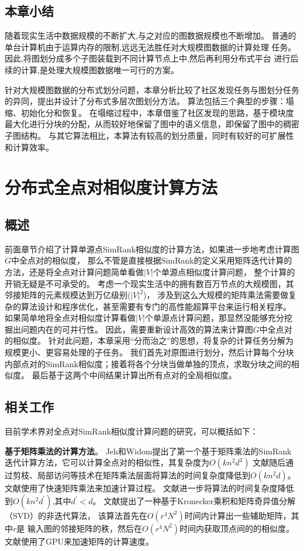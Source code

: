 \documentclass[master]{njuthesis}
\begin{document}
\section{本章小结}
随着现实生活中数据规模的不断扩大,与之对应的图数据规模也不断增加。
普通的单台计算机由于运算内存的限制,远远无法胜任对大规模图数据的计算处理
任务。因此,将图划分成多个子图装载到不同计算节点上中,然后再利用分布式平台
进行后续的计算,是处理大规模图数据唯一可行的方案。

针对大规模图数据的分布式划分问题，本章分析比较了社区发现任务与图划分任务的异同，提出并设计了分布式多层次图划分方法。
算法包括三个典型的步骤：塌缩、初始化分和恢复。
在塌缩过程中，本章借鉴了社区发现的思路，基于模块度最大化进行分块的分配，从而较好地保留了图中的语义信息，即保留了图中的稠密子图结构。
与其它算法相比，本算法有较高的划分质量，同时有较好的可扩展性和计算效率。

\chapter{分布式全点对相似度计算方法}\label{chapter_allSimRank}
\section{概述}
前面章节介绍了计算单源点SimRank相似度的计算方法，如果进一步地考虑计算图$G$中全点对的相似度，
那么不管是直接根据SimRank的定义采用矩阵迭代计算的方法，还是将全点对计算问题简单看做$|V|$个单源点相似度计算问题，
整个计算的开销无疑是不可承受的。
考虑一个现实生活中的拥有数百万节点的大规模图，其邻接矩阵的元素规模达到万亿级别($|V|^2$)，
涉及到这么大规模的矩阵乘法需要做复杂的算法设计和程序优化，甚至需要有专门的高性能超算平台来运行相关程序。
如果简单地将全点对相似度计算看做$|V|$个单源点计算问题，那显然没能够充分挖掘出问题内在的可并行性。
因此，需要重新设计高效的算法来计算图$G$中全点对的相似度。
针对此问题，本章采用“分而治之”的思想，将复杂的计算任务分解为规模更小、更容易处理的子任务。
我们首先对原图进行划分，然后计算每个分块内部点对的SimRank相似度；接着将各个分块当做单独的顶点，求取分块之间的相似度。
最后基于这两个中间结果计算出所有点对的全局相似度。
\section{相关工作}
目前学术界对全点对SimRank相似度计算问题的研究，可以概括如下：

\textbf{基于矩阵乘法的计算方法}。 
Jeh和Widom\cite{jeh2002simrank}提出了第一个基于矩阵乘法的SimRank迭代计算方法，它可以计算全点对的相似性，其复杂度为$O(kn^2d^2)$
文献\cite{lizorkin2008accuracy}随后通过剪枝、局部访问等技术在矩阵乘法层面将算法的时间复杂度降低到$O(kn^2d)$。
文献\cite{yu2012space}使用了快速矩阵乘法来加速计算过程。
文献\cite{yu2013towards}进一步将算法的时间复杂度降低到$O(kn^2d^{\prime})$,其中$d^\prime < d$。
文献\cite{li2010fast1}提出了一种基于Kronecker乘积和矩阵奇异值分解（SVD）的非迭代算法，
该算法首先在$O(r^4N^2)$时间内计算出一些辅助矩阵，其中$r$是
输入图的邻接矩阵的秩，然后在$O(r^4N^2)$时间内获取顶点间的的相似度。
文献\cite{he2010parallel}使用了GPU来加速矩阵的计算速度。
\end{document}
